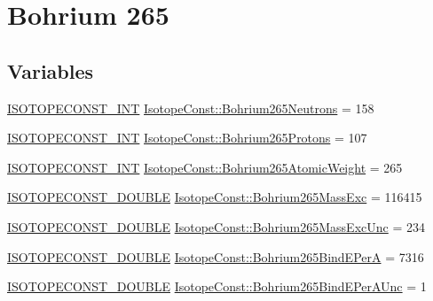 \hypertarget{group___isotope_const-_bohrium-_bh265}{}\section{Bohrium 265}
\label{group___isotope_const-_bohrium-_bh265}
\subsection*{Variables}
\begin{DoxyCompactItemize}
\item 
\mbox{\hyperlink{group___isotope_const-_macros_ga5f18360b3e99483a35c32d789e62621c}{I\+S\+O\+T\+O\+P\+E\+C\+O\+N\+S\+T\+\_\+\+I\+NT}} \mbox{\hyperlink{group___isotope_const-_bohrium-_bh265_gaf50b8b815ba935465d4228d84de09acb}{Isotope\+Const\+::\+Bohrium265\+Neutrons}} = 158
\item 
\mbox{\hyperlink{group___isotope_const-_macros_ga5f18360b3e99483a35c32d789e62621c}{I\+S\+O\+T\+O\+P\+E\+C\+O\+N\+S\+T\+\_\+\+I\+NT}} \mbox{\hyperlink{group___isotope_const-_bohrium-_bh265_gac65004eee092975c6230aa99ebeb44c5}{Isotope\+Const\+::\+Bohrium265\+Protons}} = 107
\item 
\mbox{\hyperlink{group___isotope_const-_macros_ga5f18360b3e99483a35c32d789e62621c}{I\+S\+O\+T\+O\+P\+E\+C\+O\+N\+S\+T\+\_\+\+I\+NT}} \mbox{\hyperlink{group___isotope_const-_bohrium-_bh265_ga16f6d2c28d9c8aaa3a7f19f1e4f369c1}{Isotope\+Const\+::\+Bohrium265\+Atomic\+Weight}} = 265
\item 
\mbox{\hyperlink{group___isotope_const-_macros_ga8f45a7272ce02c0b4c65c44636ed719a}{I\+S\+O\+T\+O\+P\+E\+C\+O\+N\+S\+T\+\_\+\+D\+O\+U\+B\+LE}} \mbox{\hyperlink{group___isotope_const-_bohrium-_bh265_gaa8df36fc6df7798da36647f00e75e03f}{Isotope\+Const\+::\+Bohrium265\+Mass\+Exc}} = 116415
\item 
\mbox{\hyperlink{group___isotope_const-_macros_ga8f45a7272ce02c0b4c65c44636ed719a}{I\+S\+O\+T\+O\+P\+E\+C\+O\+N\+S\+T\+\_\+\+D\+O\+U\+B\+LE}} \mbox{\hyperlink{group___isotope_const-_bohrium-_bh265_ga1b90c68ce65e9d665df3ce05ff41790f}{Isotope\+Const\+::\+Bohrium265\+Mass\+Exc\+Unc}} = 234
\item 
\mbox{\hyperlink{group___isotope_const-_macros_ga8f45a7272ce02c0b4c65c44636ed719a}{I\+S\+O\+T\+O\+P\+E\+C\+O\+N\+S\+T\+\_\+\+D\+O\+U\+B\+LE}} \mbox{\hyperlink{group___isotope_const-_bohrium-_bh265_gaacf5ff20950f408c9220b832b090061b}{Isotope\+Const\+::\+Bohrium265\+Bind\+E\+PerA}} = 7316
\item 
\mbox{\hyperlink{group___isotope_const-_macros_ga8f45a7272ce02c0b4c65c44636ed719a}{I\+S\+O\+T\+O\+P\+E\+C\+O\+N\+S\+T\+\_\+\+D\+O\+U\+B\+LE}} \mbox{\hyperlink{group___isotope_const-_bohrium-_bh265_ga2547cd22347f5927275f7bee4efb9f5f}{Isotope\+Const\+::\+Bohrium265\+Bind\+E\+Per\+A\+Unc}} = 1

\end{DoxyCompactItemize}

